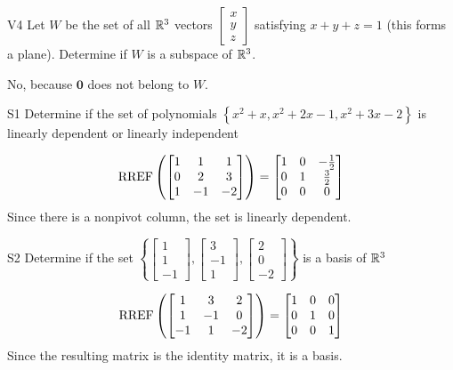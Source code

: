 \documentclass{sbgLAexam}
\begin{document}
\begin{problem}{V4} Let \(W\) be the set of all \(\mathbb{R}^3\) vectors
\(\begin{bmatrix} x \\ y \\ z \end{bmatrix}\)
satisfying \(x+y+z=1\) (this forms a plane).
Determine if \(W\) is a subspace of \(\mathbb{R}^3\).
\end{problem}
\begin{solution}
No, because \(\mathbf{0}\) does not belong to \(W\).
\end{solution}


\begin{extract}\newpage\end{extract}
\begin{problem}{S1}
Determine if the set of polynomials  $\left\{x^2+x, x^2+2x-1, x^2+3x-2\right\}$ is  linearly dependent or linearly independent
\end{problem}
\begin{solution}
$$\operatorname{RREF}\left( \begin{bmatrix} 1 &  1 & 1 \\ 0  & 2 & 3 \\ 1  & -1 & -2 \end{bmatrix} \right) = \begin{bmatrix} 1 &  0 & -\frac{1}{2} \\ 0  & 1 & \frac{3}{2} \\ 0& 0 & 0  \end{bmatrix}$$
Since there is a nonpivot column, the set is linearly dependent.
\end{solution}


\begin{problem}{S2}
Determine if the set $\left\{\begin{bmatrix} 1 \\ 1 \\ -1 \end{bmatrix}, \begin{bmatrix} 3 \\ -1 \\ 1 \end{bmatrix},\begin{bmatrix} 2 \\ 0 \\ -2 \end{bmatrix}\right\}$ is a basis of $\mathbb{R}^3$
\end{problem}
\begin{solution}
$$\operatorname{RREF}\left(\begin{bmatrix} 1 & 3 & 2 \\ 1 & -1 & 0 \\ -1 & 1 & -2 \end{bmatrix} \right)= \begin{bmatrix} 1 & 0 &0 \\ 0 & 1 & 0 \\ 0 & 0 & 1\end{bmatrix}$$
Since the resulting matrix is the identity matrix, it is a basis.
\end{solution}
\end{document}
